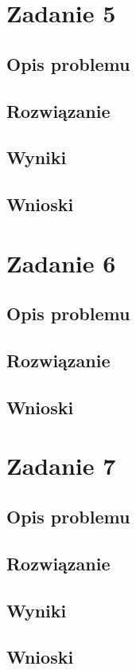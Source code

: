 \documentclass{article}
\begin{document}
\begin{center}
    \section{Zadanie 5}
    \subsection{Opis problemu}
 
    \subsection{Rozwiązanie}

    \subsection{Wyniki}

    \subsection{Wnioski}

    \section{Zadanie 6}
    \subsection{Opis problemu}

    \subsection{Rozwiązanie}
   
    \subsection{Wnioski}

    \section{Zadanie 7}
    \subsection{Opis problemu}

    \subsection{Rozwiązanie}

    \subsection{Wyniki}
    
    \subsection{Wnioski}

    \end{center}
\end{document}
